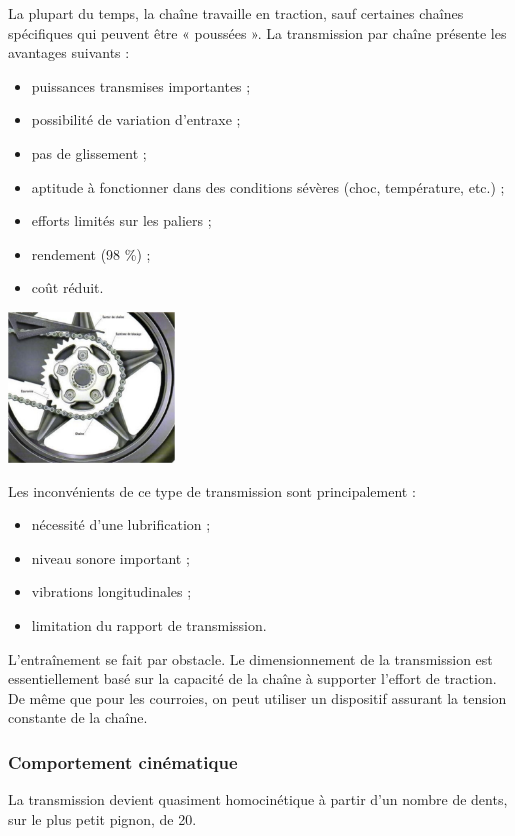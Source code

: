 \documentclass[11pt,oneside]{article}
\begin{document}
\begin{minipage}[c]{.55\linewidth}
La plupart du temps, la chaîne travaille en traction, sauf certaines chaînes spécifiques qui peuvent être « poussées ».
La transmission par chaîne présente les avantages suivants :
\begin{itemize}
\item puissances transmises importantes ;
\item possibilité de variation d’entraxe ;
\item pas de glissement ;
\item aptitude à fonctionner dans des conditions sévères (choc, température, etc.) ;
\item efforts limités sur les paliers ;
\item rendement (98 \%) ;
\item coût réduit.
\end{itemize}
\end{minipage} \hfill
\begin{minipage}[c]{.4\linewidth}
\begin{center}
\includegraphics[height=4cm]{png/fig_49}
\end{center}
\end{minipage}

Les inconvénients de ce type de transmission sont principalement :
\begin{itemize}
\item nécessité d’une lubrification ;
\item niveau sonore important ;
\item vibrations longitudinales ;
\item limitation du rapport de transmission.
\end{itemize}
L’entraînement se fait par obstacle. Le dimensionnement de la transmission est essentiellement basé sur la capacité de la chaîne à supporter l’effort de traction. De même que pour les courroies, on peut utiliser un dispositif assurant la tension constante de la chaîne.

\subsubsection{Comportement cinématique}
 La transmission devient quasiment homocinétique à partir d’un nombre de dents, sur le plus petit pignon, de 20.
\end{document}
